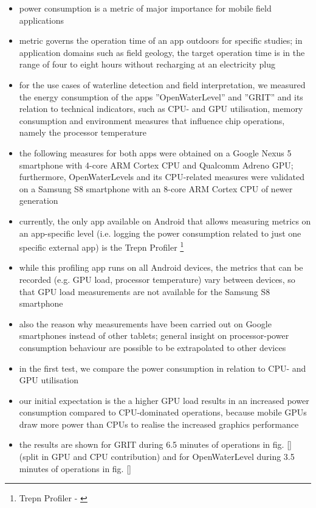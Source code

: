 \documentclass[review]{elsarticle}
\begin{document}
\begin{itemize}
\item power consumption is a metric of major importance for mobile field applications
\item metric governs the operation time of an app outdoors for specific studies; in application domains such as field geology, the target operation time is in the range of four to eight hours without recharging at an electricity plug
\item for the use cases of waterline detection and field interpretation, we measured the energy consumption of the apps ''OpenWaterLevel'' and ''GRIT'' and its relation to technical indicators, such as \gls{CPU}- and \gls{GPU} utilisation, memory consumption and environment measures that influence chip operations, namely the processor temperature
\item the following measures for both apps were obtained on a Google Nexus 5 smartphone with 4-core ARM Cortex \gls{CPU} and Qualcomm Adreno \gls{GPU}; furthermore, OpenWaterLevels and its \gls{CPU}-related measures were validated on a Samsung S8 smartphone with an 8-core ARM Cortex \gls{CPU} of newer generation
\item currently, the only app available on Android that allows measuring metrics on an app-specific level (i.e. logging the power consumption related to just one specific external app) is the Trepn Profiler \footnote{Trepn Profiler - \url{}}
\item while this profiling app runs on all Android devices, the metrics that can be recorded (e.g. \gls{GPU} load, processor temperature) vary between devices, so that \gls{GPU} load measurements are not available for the Samsung S8 smartphone
\item also the reason why measurements have been carried out on Google smartphones instead of other tablets; general insight on processor-power consumption behaviour are possible to be extrapolated to other devices
\end{itemize}

\begin{itemize}
\item in the first test, we compare the power consumption in relation to \gls{CPU}- and \gls{GPU} utilisation
\item our initial expectation is the a higher \gls{GPU} load results in an increased power consumption compared to \gls{CPU}-dominated operations, because mobile \glspl{GPU} draw more power than \glspl{CPU} to realise the increased graphics performance
\item the results are shown for GRIT during 6.5 minutes of operations in fig. \ref{} (split in \gls{GPU} and \gls{CPU} contribution) and for OpenWaterLevel during 3.5 minutes of operations in fig. \ref{}
\end{itemize}
\end{document}
